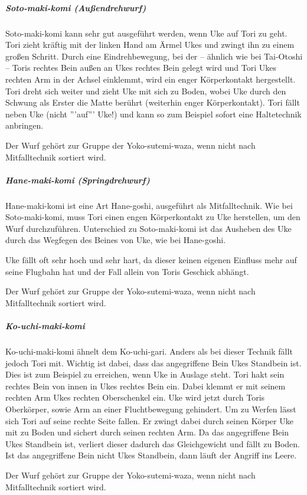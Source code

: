 \documentclass[justified, a4paper, notitlepage, captions=tableheading, nobib]{tufte-handout}
\begin{document}
\subparagraph{Soto-maki-komi (Außendrehwurf)}
\label{sec:org1166b19}

Soto-maki-komi kann sehr gut ausgeführt werden, wenn Uke auf Tori zu geht. Tori zieht kräftig mit der linken Hand am Ärmel Ukes und zwingt ihn zu einem großen Schritt. Durch eine Eindrehbewegung, bei der – ähnlich wie bei Tai-Otoshi – Toris rechtes Bein außen an Ukes rechtes Bein gelegt wird und Tori Ukes rechten Arm in der Achsel einklemmt, wird ein enger Körperkontakt hergestellt. Tori dreht sich weiter und zieht Uke mit sich zu Boden, wobei Uke durch den Schwung als Erster die Matte berührt (weiterhin enger Körperkontakt). Tori fällt neben Uke (nicht '''auf''' Uke!) und kann so zum Beispiel sofort eine Haltetechnik anbringen.

Der Wurf gehört zur Gruppe der Yoko-sutemi-waza, wenn nicht nach Mitfalltechnik sortiert wird.

\subparagraph{Hane-maki-komi (Springdrehwurf)}
\label{sec:org9599677}
Hane-maki-komi ist eine Art Hane-goshi, ausgeführt als Mitfalltechnik.
Wie bei Soto-maki-komi, muss Tori einen engen Körperkontakt zu Uke herstellen, um den Wurf durchzuführen.
Unterschied zu Soto-maki-komi ist das Ausheben des Uke durch das Wegfegen des Beines von Uke, wie bei Hane-goshi.

Uke fällt oft sehr hoch und sehr hart, da dieser keinen eigenen Einfluss mehr auf seine Flugbahn hat und der Fall allein von Toris Geschick abhängt.

Der Wurf gehört zur Gruppe der Yoko-sutemi-waza, wenn nicht nach Mitfalltechnik sortiert wird.

\subparagraph{Ko-uchi-maki-komi}
\label{sec:org1beb2b7}
Ko-uchi-maki-komi ähnelt dem Ko-uchi-gari. Anders als bei dieser Technik fällt jedoch Tori mit. Wichtig ist dabei, dass das angegriffene Bein Ukes Standbein ist. Dies ist zum Beispiel zu erreichen, wenn Uke in Auslage steht. Tori hakt sein rechtes Bein von innen in Ukes rechtes Bein ein. Dabei klemmt er mit seinem rechten Arm Ukes rechten Oberschenkel ein. Uke wird jetzt durch Toris Oberkörper, sowie Arm an einer Fluchtbewegung gehindert. Um zu Werfen lässt sich Tori auf seine rechte Seite fallen. Er zwingt dabei durch seinen Körper Uke mit zu Boden und sichert durch seinen rechten Arm. Da das angegriffene Bein Ukes Standbein ist, verliert dieser dadurch das Gleichgewicht und fällt zu Boden. Ist das angegriffene Bein nicht Ukes Standbein, dann läuft der Angriff ins Leere.

Der Wurf gehört zur Gruppe der Yoko-sutemi-waza, wenn nicht nach Mitfalltechnik sortiert wird.
\end{document}
